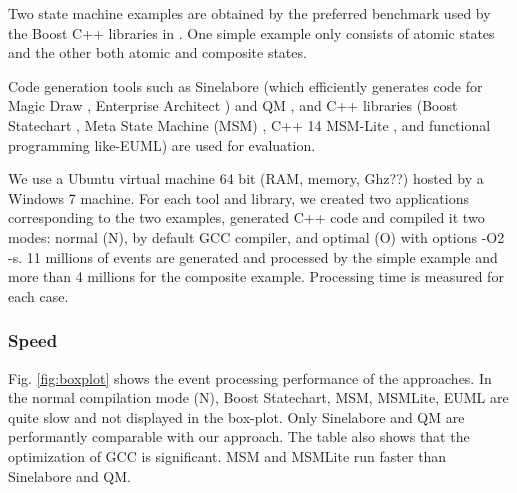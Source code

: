 


Two state machine examples are obtained by the preferred benchmark used by the Boost C++ libraries \cite{boost} in \cite{benchmark}. One simple example \cite{simpleexample} only consists of atomic states and the other \cite{compositeexample} both atomic and composite states. 

Code generation tools such as Sinelabore (which efficiently generates code for Magic Draw \cite{Magicdraw}, Enterprise Architect \cite{EA}) and QM \cite{qm}
, and C++ libraries (Boost Statechart \cite{Statechart}, Meta State Machine (MSM) \cite{MSM}, C++ 14 MSM-Lite \cite{benchmark}, and functional programming like-EUML\cite{EUML}) are used for evaluation. 

\noindent
{} We use a Ubuntu virtual machine 64 bit (RAM, memory, Ghz??) hosted by a Windows 7 machine. 
For each tool and library, we created two applications corresponding to the two examples, generated C++ code and compiled it two modes: normal (N), by default GCC compiler, and optimal (O) with options -O2 -s. 
11 millions of events are generated and processed by the simple example and more than 4 millions for the composite example. 
Processing time is measured for each case. 

\subsubsection{Speed} 
Fig. \ref{fig:boxplot} shows the event processing performance of the approaches.
In the normal compilation mode (N), Boost Statechart, MSM, MSMLite, EUML are quite slow and not displayed in the box-plot. 
Only Sinelabore and QM are performantly comparable with our approach. 
The table also shows that the optimization of GCC is significant. 
MSM and MSMLite run faster than Sinelabore and QM.   

